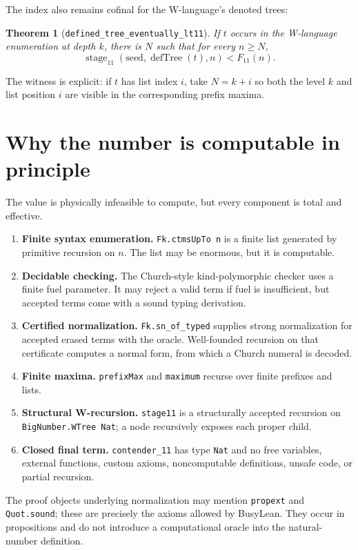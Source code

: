 \documentclass[11pt]{article}
\newtheorem{theorem}{Theorem}[section]
\theoremstyle{definition}
\theoremstyle{remark}
\newcommand{\lean}[1]{\texttt{#1}}
\begin{document}
The index also remains cofinal for the W-language's denoted trees:
\begin{theorem}[\lean{defined\_tree\_eventually\_lt11}]
If $t$ occurs in the W-language enumeration at depth $k$, there is $N$ such
that for every $n\ge N$,
\[
  \operatorname{stage}_{11}(\mathrm{seed},\operatorname{defTree}(t),n)
  <F_{11}(n).
\]
\end{theorem}
The witness is explicit: if $t$ has list index $i$, take $N=k+i$ so both the
level $k$ and list position $i$ are visible in the corresponding prefix maxima.

\section{Why the number is computable in principle}

The value is physically infeasible to compute, but every component is total
and effective.

\begin{enumerate}[leftmargin=*]
\item \textbf{Finite syntax enumeration.}
  \lean{Fk.ctmsUpTo n} is a finite list generated by primitive recursion on
  $n$.  The list may be enormous, but it is computable.
\item \textbf{Decidable checking.}
  The Church-style kind-polymorphic checker uses a finite fuel parameter.  It
  may reject a valid term if fuel is insufficient, but accepted terms come with
  a sound typing derivation.
\item \textbf{Certified normalization.}
  \lean{Fk.sn\_of\_typed} supplies strong normalization for accepted erased
  terms with the oracle.  Well-founded recursion on that certificate computes a
  normal form, from which a Church numeral is decoded.
\item \textbf{Finite maxima.}
  \lean{prefixMax} and \lean{maximum} recurse over finite prefixes and lists.
\item \textbf{Structural W-recursion.}
  \lean{stage11} is a structurally accepted recursion on
  \lean{BigNumber.WTree Nat}; a node recursively exposes each proper child.
\item \textbf{Closed final term.}
  \lean{contender\_11} has type \lean{Nat} and no free variables, external
  functions, custom axioms, noncomputable definitions, unsafe code, or partial
  recursion.
\end{enumerate}

The proof objects underlying normalization may mention \lean{propext} and
\lean{Quot.sound}; these are precisely the axioms allowed by BusyLean.  They
occur in propositions and do not introduce a computational oracle into the
natural-number definition.
\end{document}
